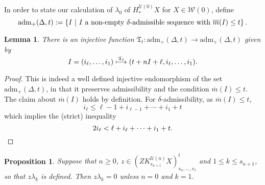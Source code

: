 \documentclass[11pt]{amsart} \renewcommand{\baselinestretch}{1.2}
\theoremstyle{plain}
\newtheorem{lem}[thm]{Lemma}
\newtheorem{prop}[thm]{Proposition}
\numberwithin{equation}{section} %
\theoremstyle{plain}
\newtheorem{lem}[thm]{Lemma}
\newtheorem{prop}[thm]{Proposition}
\numberwithin{equation}{chapter} %
\DeclareMathOperator{\im}{im}
\renewcommand{\to}{\longrightarrow}
\newcommand{\calU}{\mathcal{U}}
\newcommand{\calw}{\mathcal{W}}
\newcommand{\minDimP}{\overline{m}}
\newcommand{\Sq}{\mathrm{Sq}}
\newcommand{\aD}[1]{\mathrm{adm}_+(\Delta,#1)}
\newcommand{\aDirr}[1]{\mathrm{adm}_+^\mathrm{irr}(\Delta,#1)}
\newcommand{\F}{\mathbb{F}}
\newcommand{\Ftwo}{\F_2}
\newcommand{\TOP}{\mathfrak{T}}
\begin{document}
\begin{Koszul complexes}
In order to state our calculation of $\lambda_0$ of $H^{\calU(0)}_*X$ for $X\in\calw(0)$, define
\[\aD{t}:=\left\{I\ \middle|\ \textup{$I$ a non-empty $\delta$-admissible sequence with }\minDimP(I)\leq t\right\}.\]
\begin{lem}
\label{lemma on the func TOPt}
There is an injective function $\TOP_t:\aD{t}\to \aD{t}$ given by
\[I=(i_{\ell},\ldots,i_1)\overset{\smash{\TOP_t}}{\longmapsto }(t+nI+\ell,i_\ell,\ldots,i_1).\]
\end{lem}
\begin{proof}
This is indeed a well defined injective endomorphism of the set $\aD{t}$, in that it preserves admissibility and the condition $\minDimP(I)\leq t$. The claim about $\minDimP(I)$ holds by definition. For $\delta$-admissibility, as $\minDimP(I)\leq t$,
\[i_{\ell}
\leq
\ell-1+i_{\ell-1}+\cdots +i_1+t\]
which implies the (strict) inequality
\[2i_{\ell}< \ell+i_{\ell}+\cdots +i_1+t.\qedhere\]
%
\end{proof}
\begin{prop}
\label{QkTrivial}
Suppose that $n\geq 0$, $z\in (ZK^{\calU(n)}_{s_{n+1}}X)_{s_n,\ldots,s_1}^t$ and $1\leq k\leq s_{n+1}$, so that $z\lambda_k$ is defined. Then $z\lambda_k=0$ unless $n=0$ and $k=1$.


\end{prop}
\end{Koszul complexes}
\end{document}

